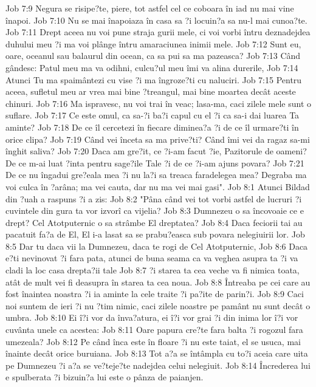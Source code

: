 Job 7:9  Negura se risipe?te, piere, tot astfel cel ce coboara în iad nu mai vine înapoi.
Job 7:10  Nu se mai înapoiaza în casa sa ?i locuin?a sa nu-l mai cunoa?te.
Job 7:11  Drept aceea nu voi pune straja gurii mele, ci voi vorbi întru deznadejdea duhului meu ?i ma voi plânge întru amaraciunea inimii mele.
Job 7:12  Sunt eu, oare, oceanul sau balaurul din ocean, ca sa pui sa ma pazeasca?
Job 7:13  Când gândesc: Patul meu ma va odihni, culcu?ul meu îmi va alina durerile,
Job 7:14  Atunci Tu ma spaimântezi cu vise ?i ma îngroze?ti cu naluciri.
Job 7:15  Pentru aceea, sufletul meu ar vrea mai bine ?treangul, mai bine moartea decât aceste chinuri.
Job 7:16  Ma ispravesc, nu voi trai în veac; lasa-ma, caci zilele mele sunt o suflare.
Job 7:17  Ce este omul, ca sa-?i ba?i capul cu el ?i ca sa-i dai luarea Ta aminte?
Job 7:18  De ce îl cercetezi în fiecare diminea?a ?i de ce îl urmare?ti în orice clipa?
Job 7:19  Când vei înceta sa ma prive?ti? Când îmi vei da ragaz sa-mi înghit saliva?
Job 7:20  Daca am gre?it, ce ?i-am facut ?ie, Pazitorule de oameni? De ce m-ai luat ?inta pentru sage?ile Tale ?i de ce ?i-am ajuns povara?
Job 7:21  De ce nu îngadui gre?eala mea ?i nu la?i sa treaca faradelegea mea? Degraba ma voi culca în ?arâna; ma vei cauta, dar nu ma vei mai gasi".
Job 8:1  Atunci Bildad din ?uah a raspuns ?i a zis:
Job 8:2  "Pâna când vei tot vorbi astfel de lucruri ?i cuvintele din gura ta vor izvorî ca vijelia?
Job 8:3  Dumnezeu o sa încovoaie ce e drept? Cel Atotputernic o sa strâmbe El dreptatea?
Job 8:4  Daca feciorii tai au pacatuit fa?a de El, El i-a lasat sa se prabu?easca sub povara nelegiuirii lor.
Job 8:5  Dar tu daca vii la Dumnezeu, daca te rogi de Cel Atotputernic,
Job 8:6  Daca e?ti nevinovat ?i fara pata, atunci de buna seama ca va veghea asupra ta ?i va cladi la loc casa drepta?ii tale
Job 8:7  ?i starea ta cea veche va fi nimica toata, atât de mult vei fi deasupra în starea ta cea noua.
Job 8:8  Întreaba pe cei care au fost înaintea noastra ?i ia aminte la cele traite ?i pa?ite de parin?i.
Job 8:9  Caci noi suntem de ieri ?i nu ?tim nimic, caci zilele noastre pe pamânt nu sunt decât o umbra.
Job 8:10  Ei î?i vor da înva?atura, ei î?i vor grai ?i din inima lor î?i vor cuvânta unele ca acestea:
Job 8:11  Oare papura cre?te fara balta ?i rogozul fara umezeala?
Job 8:12  Pe când înca este în floare ?i nu este taiat, el se usuca, mai înainte decât orice buruiana.
Job 8:13  Tot a?a se întâmpla cu to?i aceia care uita pe Dumnezeu ?i a?a se ve?teje?te nadejdea celui nelegiuit.
Job 8:14  Încrederea lui e spulberata ?i bizuin?a lui este o pânza de paianjen.
